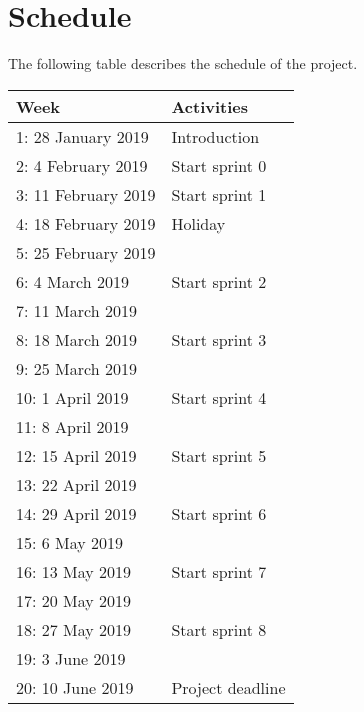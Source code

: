 \section{Schedule}
The following table describes the schedule of the project.
\begin{center}
\begin{tabular}{|l|l|}
\hline
\textbf{Week} & \textbf{Activities} \\ \hline
1: 28 January 2019 & Introduction \\ \hline
2: 4 February 2019 & Start sprint 0 \\ \hline
3: 11 February 2019 & Start sprint 1 \\ \hline
4: 18 February 2019 & Holiday \\ \hline
5: 25 February 2019 &  \\ \hline
6: 4 March 2019 & Start sprint 2 \\ \hline
7: 11 March 2019 &  \\ \hline
8: 18 March 2019 & Start sprint 3 \\ \hline
9: 25 March 2019 &  \\ \hline
10: 1 April  2019 & Start sprint 4 \\ \hline
11: 8 April 2019 &  \\ \hline
12: 15 April 2019 & Start sprint 5 \\ \hline
13: 22 April 2019 &  \\ \hline
14: 29 April 2019 & Start sprint 6 \\ \hline
15: 6 May 2019 &  \\ \hline
16: 13 May 2019 & Start sprint 7 \\ \hline
17: 20 May 2019 &  \\ \hline
18: 27 May 2019 & Start sprint 8 \\ \hline
19: 3 June 2019 &  \\ \hline
20: 10 June 2019 & Project deadline \\ \hline
\end{tabular}
\end{center}

